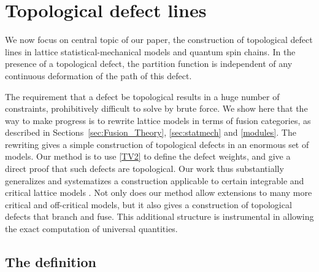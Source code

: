 
\section{Topological defect lines}
\label{sec:topological_defect_lines}

We now focus on central topic of our paper, the construction of topological defect lines in lattice statistical-mechanical models and quantum spin chains. In the presence of a topological defect, the partition function is independent of any continuous deformation of the path of this defect.

The requirement that a defect be topological results in a huge number of constraints, prohibitively difficult to solve by brute force. We show here that the way to make progress is to rewrite
lattice models in terms of fusion categories, as described in Sections~\ref{sec:Fusion_Theory}, \ref{sec:statmech} and \ref{modules}.
The rewriting gives a simple construction of topological defects in an enormous set of models.
Our method is to use \eqref{TV2} to define the defect weights, and give a direct proof that such defects are topological.
Our work thus substantially generalizes and systematizes a construction applicable to certain integrable and critical lattice models \cite{Chui2001,Chui2002,Chui2003}.
Not only does our method allow extensions to many more critical and off-critical models, but it also gives a construction of topological defects that branch and fuse. This additional structure is instrumental in allowing the exact computation of universal quantities.

\subsection{The definition}

